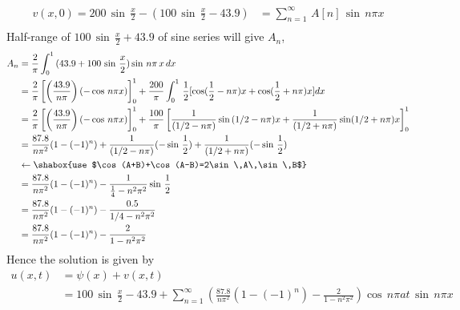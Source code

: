 \begin{align*}
v(x,0)=200\,\sin\,\frac{x}{2}-(100\,\sin\,\frac{x}{2}-43.9)&=\sum_{n=1}^\infty\,A[n]\,\sin\,n\pi x\\
\end{align*}
Half-range of $100\,\sin\,\frac{x}{2}+43.9$ of sine series will give $A_n$,
\begin{align*}
A_n&=\frac{2}{\pi}\int_0^1\,(43.9+100\,\sin\,\frac{x}{2})\sin\,n\pi\,x\,dx\\
&=\frac{2}{\pi}\left[\left(\frac{43.9}{n\pi}\right)(-\cos\,n\pi x)\right]_0^1+\frac{200}{\pi}\int_0^1\,\frac{1}{2}[\cos(\frac{1}{2}-n\pi)x+\cos(\frac{1}{2}+n\pi)x]dx\\
&=\frac{2}{\pi}\left[\left(\frac{43.9}{n\pi}\right)(-\cos\,n\pi x)\right]_0^1+\frac{100}{\pi}\left[\frac{1}{(1/2-n\pi)}\sin\,(1/2-n\pi)x+\frac{1}{(1/2+n\pi)}\sin(1/2+n\pi )x\right]_0^1\\
&=\frac{87.8}{n\pi^2}(1-(-1)^n)+\frac{1}{(1/2-n\pi)}(-\sin\,\frac{1}{2})+\frac{1}{(1/2+n\pi)}(-\sin\,\frac{1}{2})\\
&\leftarrow\shabox{use $\cos (A+B)+\cos(A-B)=2\sin\,A\,\sin \,B$}\\
&=\frac{87.8}{n\pi^2}(1-(-1)^n)-\frac{1}{\frac{1}{4}-n^2\pi^2}\sin\,\frac{1}{2}\\
&=\frac{87.8}{n\pi^2}(1-(-1)^n)-\frac{0.5}{1/4-n^2\pi^2}\\
&=\frac{87.8}{n\pi^2}(1-(-1)^n)-\frac{2}{1-n^2\pi^2}
\end{align*}
Hence the solution is given by
\begin{align}
u(x,t)&=\psi(x)+v(x,t)\\
&=100\,\sin\,\frac{x}{2}-43.9+\sum_{n=1}^\infty\left(\frac{87.8}{n\pi^2}(1-(-1)^n)-\frac{2}{1-n^2\pi^2}\right)\cos\,n\pi at\,\sin\,n\pi x
\end{align}
\newpage

